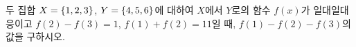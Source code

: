 두 집합 $X=\{1{,}\mkern3mu\mathopen{}2{,}\mkern3mu\mathopen{}3\}$, $Y=\{4{,}\mkern3mu\mathopen{}5{,}\mkern3mu\mathopen{}6\}$에 대하여 $X$에서 $Y$로의 함수 $f(x)$가 일대일대응이고 $f(2)-f(3)=1$, $f(1)+f(2)=11$일 때, $f(1)-f(2)-f(3)$의 값을 구하시오.

